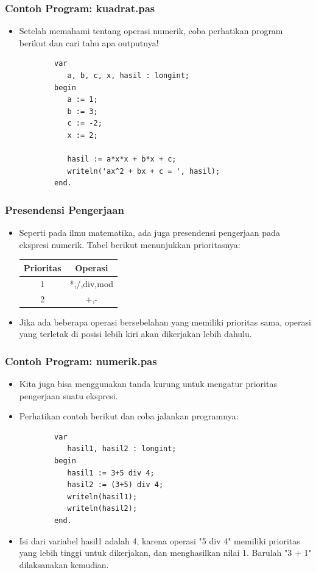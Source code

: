 \documentclass{beamer}
\begin{document}
\begin{frame}[fragile]
\frametitle{Contoh Program: kuadrat.pas}
\begin{itemize}
	\item Setelah memahami tentang operasi numerik, coba perhatikan program berikut dan cari tahu apa outputnya!
	\begin{lstlisting}
		var
		   a, b, c, x, hasil : longint;
		begin
		   a := 1;
		   b := 3;
		   c := -2;
		   x := 2;	   
		
		   hasil := a*x*x + b*x + c;
		   writeln('ax^2 + bx + c = ', hasil);
		end.
	\end{lstlisting}
\end{itemize}
\end{frame}

\begin{frame}
\frametitle{Presendensi Pengerjaan}
\begin{itemize}
	\item Seperti pada ilmu matematika, ada juga presendensi pengerjaan pada ekspresi numerik. Tabel berikut menunjukkan prioritasnya:
	
	\begin{tabular}{|c|c|}
	\hline Prioritas & Operasi \\ 
	\hline 1 & *,/,div,mod \\ 
	\hline 2 & +,- \\ 
	\hline 
	\end{tabular} 
	\item Jika ada beberapa operasi bersebelahan yang memiliki prioritas sama, operasi yang terletak di posisi lebih kiri akan dikerjakan lebih dahulu.
\end{itemize}
\end{frame}

\begin{frame}[fragile]
\frametitle{Contoh Program: numerik.pas}
\begin{itemize}
	\item Kita juga bisa menggunakan tanda kurung untuk mengatur prioritas pengerjaan suatu ekspresi.
	\item Perhatikan contoh berikut dan coba jalankan programnya:
	\begin{lstlisting}
		var
		   hasil1, hasil2 : longint;
		begin
		   hasil1 := 3+5 div 4;
		   hasil2 := (3+5) div 4;
		   writeln(hasil1);
		   writeln(hasil2);
		end.
	\end{lstlisting}
	\item Isi dari variabel hasil1 adalah 4, karena operasi "5 div 4" memiliki prioritas yang lebih tinggi untuk dikerjakan, dan menghasilkan nilai 1. Barulah "3 + 1" dilaksanakan kemudian. 
\end{itemize}
\end{frame}
\end{document}
